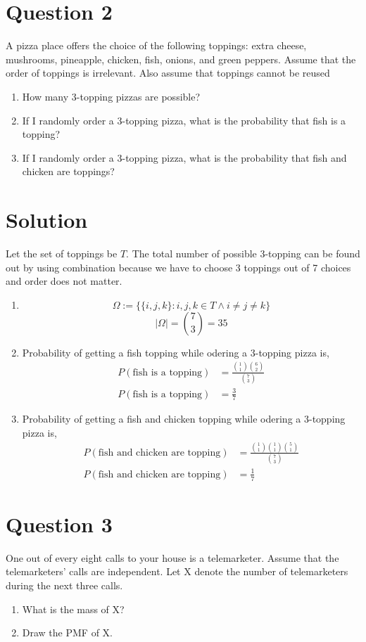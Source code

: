 \documentclass[a4paper, 11pt]{article}
\begin{document}
\section*{Question 2} A pizza place offers the choice of the following toppings: extra cheese, mushrooms, pineapple, chicken, fish, onions, and green peppers. Assume that the order of toppings is irrelevant. Also assume that toppings cannot be reused
\begin{enumerate}[label=(\alph*)]
    \item How many 3-topping pizzas are possible?
    \item If I randomly order a 3-topping pizza, what is the probability that fish is a topping?
    \item If I randomly order a 3-topping pizza, what is the probability that fish and chicken are toppings?
\end{enumerate}
\section*{Solution}
Let the set of toppings be $T$. The total number of possible 3-topping can be found out by using combination because we have to choose 3 toppings out of 7 choices and order does not matter.
\begin{enumerate}[label=(\alph*)]
    \item \[\Omega:=\big\{\{i,j,k\}:i,j,k\in T\wedge i\ne j\ne k\big\}\]
          \[|\Omega|=\binom{7}{3}=35\]
    \item Probability of getting a fish topping while odering a 3-topping pizza is,
          \begin{align*}
              P(\text{fish is a topping}) & = \frac{\binom{1}{1}\binom{6}{2}}{\binom{7}{3}} \\
              P(\text{fish is a topping}) & = \frac{3}{7}
          \end{align*}
    \item Probability of getting a fish and chicken topping while odering a 3-topping pizza is,
          \begin{align*}
              P(\text{fish and chicken are topping}) & = \frac{\binom{1}{1}\binom{1}{1}\binom{5}{1}}{\binom{7}{3}} \\
              P(\text{fish and chicken are topping}) & = \frac{1}{7}
          \end{align*}
\end{enumerate}
\break
\section*{Question 3} One out of every eight calls to your house is a telemarketer. Assume that the telemarketers' calls are independent. Let X denote the number of telemarketers during the next three calls.
\begin{enumerate}[label=(\alph*)]
    \item What is the mass of X?
    \item Draw the PMF of X.
\end{enumerate}
\end{document}
